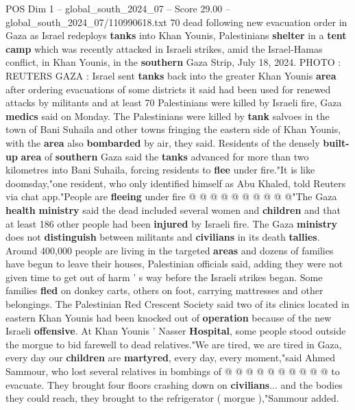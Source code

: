 \begin{textsample}{POS Dim 1 – global\_south\_2024\_07 – Score 29.00 – global\_south\_2024\_07/110990618.txt}  \label{ex:f1_pos_180}
70 dead following new evacuation order in Gaza as Israel redeploys \textbf{tanks} into Khan Younis, Palestinians \textbf{shelter} in a \textbf{tent} \textbf{camp} which was recently attacked in Israeli strikes, amid the Israel-Hamas conflict, in Khan Younis, in the \textbf{southern} Gaza Strip, July 18, 2024.
PHOTO : REUTERS GAZA : Israel sent \textbf{tanks} back into the greater Khan Younis \textbf{area} after ordering evacuations of some districts it said had been used for renewed attacks by militants and at least 70 Palestinians were killed by Israeli fire, Gaza \textbf{medics} said on Monday.
The Palestinians were killed by \textbf{tank} salvoes in the town of Bani Suhaila and other towns fringing the eastern side of Khan Younis, with the \textbf{area} also \textbf{bombarded} by air, they said.
Residents of the densely \textbf{built-up} \textbf{area} of \textbf{southern} Gaza said the \textbf{tanks} advanced for more than two kilometres into Bani Suhaila, forcing residents to \textbf{flee} under fire."It is like doomsday,"one resident, who only identified himself as Abu Khaled, told Reuters via chat app."People are \textbf{fleeing} under fire @ @ @ @ @ @ @ @ @ @"The Gaza \textbf{health} \textbf{ministry} said the dead included several women and \textbf{children} and that at least 186 other people had been \textbf{injured} by Israeli fire.
The Gaza \textbf{ministry} does not \textbf{distinguish} between militants and \textbf{civilians} in its death \textbf{tallies}.
Around 400,000 people are living in the targeted \textbf{areas} and dozens of families have begun to leave their houses, Palestinian officials said, adding they were not given time to get out of harm ' s way before the Israeli strikes began.
Some families \textbf{fled} on donkey carts, others on foot, carrying mattresses and other belongings.
The Palestinian Red Crescent Society said two of its clinics located in eastern Khan Younis had been knocked out of \textbf{operation} because of the new Israeli \textbf{offensive}.
At Khan Younis ' Nasser \textbf{Hospital}, some people stood outside the morgue to bid farewell to dead relatives."We are tired, we are tired in Gaza, every day our \textbf{children} are \textbf{martyred}, every day, every moment,"said Ahmed Sammour, who lost several relatives in bombings of @ @ @ @ @ @ @ @ @ @ to evacuate.
They brought four floors crashing down on \textbf{civilians}... and the bodies they could reach, they brought to the refrigerator ( morgue ),"Sammour added.

\end{textsample}
